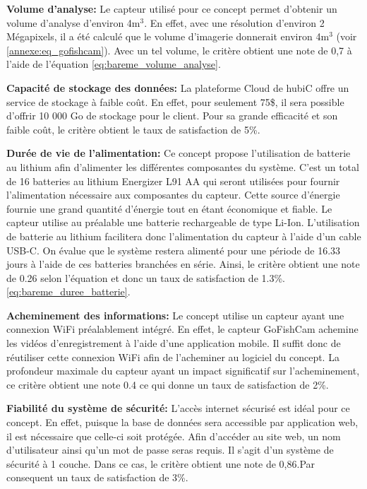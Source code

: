 \textbf{Volume d'analyse:} Le capteur utilisé pour ce concept permet d'obtenir un volume d'analyse d'environ 4m$^3$. En effet, avec une résolution d'environ 2 Mégapixels, il a été calculé que le volume d'imagerie donnerait environ 4m$^3$ (voir \ref{annexe:eq_gofishcam}). Avec un tel volume, le critère obtient une note de 0,7 à l'aide de l'équation \ref{eq:bareme_volume_analyse}.
\vspace{5mm}

\textbf{Capacité de stockage des données:} La plateforme Cloud de hubiC offre un service de stockage à faible coût. En effet, pour seulement 75\$, il sera possible d'offrir 10 000 Go de stockage pour le client. Pour sa grande efficacité et son faible coût, le critère obtient le taux de satisfaction de 5\%. \vspace{5mm}

\textbf{Durée de vie de l'alimentation:} Ce concept propose l'utilisation de batterie au lithium afin d'alimenter les différentes composantes du système. C'est un total de 16 batteries au lithium Energizer L91 AA qui seront utilisées pour fournir l'alimentation nécessaire aux composantes du capteur. Cette source d'énergie fournie une grand quantité d'énergie tout en étant économique et fiable. Le capteur utilise au préalable une batterie rechargeable de type Li-Ion. L'utilisation de batterie au lithium facilitera donc l'alimentation du capteur à l'aide d'un cable USB-C. On évalue que le système restera alimenté pour une période de 16.33 jours à l'aide de ces batteries branchées en série. Ainsi, le critère obtient une note de 0.26 selon l'équation et donc un taux de satisfaction de 1.3\%. \ref{eq:bareme_duree_batterie}.
\vspace{5mm}

\textbf{Acheminement des informations:} Le concept utilise un capteur ayant une connexion WiFi préalablement intégré. En effet, le capteur GoFishCam achemine les vidéos d'enregistrement à l'aide d'une application mobile. Il suffit donc de réutiliser cette connexion WiFi afin de l'acheminer au logiciel du concept. La profondeur maximale du capteur ayant un impact significatif sur l'acheminement, ce critère obtient une note 0.4 ce qui donne un taux de satisfaction de 2\%. \vspace{5mm}

\textbf{Fiabilité du système de sécurité:} L'accès internet sécurisé est idéal pour ce concept. En effet, puisque la base de données sera accessible par application web, il est nécessaire que celle-ci soit protégée. Afin d'accéder au site web, un nom d'utilisateur ainsi qu'un mot de passe seras requis. Il s'agit d'un système de sécurité à 1 couche. Dans ce cas, le critère obtient une note de 0,86.Par consequent un taux de satisfaction de 3\%.
\vspace{5mm}

